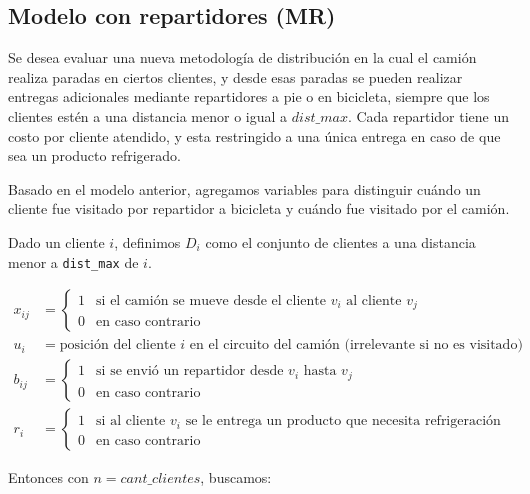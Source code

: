 \documentclass[10pt]{article}
\begin{document}
\subsection{Modelo con repartidores (MR)}

Se desea evaluar una nueva metodología de distribución en la cual el camión realiza paradas en ciertos clientes, y desde esas paradas se pueden realizar entregas adicionales mediante repartidores a pie o en bicicleta, siempre que los clientes estén a una distancia menor o igual a $dist\_max$. Cada repartidor tiene un costo por cliente atendido, y esta restringido a una única entrega en caso de que sea un producto refrigerado.


Basado en el modelo anterior, agregamos variables para distinguir cuándo un cliente fue visitado por repartidor a bicicleta y cuándo fue visitado por el camión.

	\vspace{5mm}

	Dado un cliente $i$, definimos $D_i$ como el conjunto de clientes a una distancia menor a \texttt{dist\_max} de $i$.
	
	\begin{align*}
		x_{ij} &= 
		\begin{cases}
			1 & \text{si el camión se mueve desde el cliente $v_i$ al cliente $v_j$} \\
			0 & \text{en caso contrario}
		\end{cases} \\[1em]
		u_i &= \text{posición del cliente $i$ en el circuito del camión (irrelevante si no es visitado)} \\[1em]
		b_{ij} &= 
		\begin{cases}
			1 & \text{si se envió un repartidor desde $v_i$ hasta $v_j$} \\
			0 & \text{en caso contrario}
		\end{cases} \\[1em]
		r_i &=
		\begin{cases}
			1 & \text{si al cliente $v_i$ se le entrega un producto que necesita refrigeración} \\
			0 & \text{en caso contrario}
		\end{cases}
	\end{align*}
	
\vspace{5mm}

\clearpage

	Entonces con $n = cant\_clientes$, buscamos:
\end{document}
